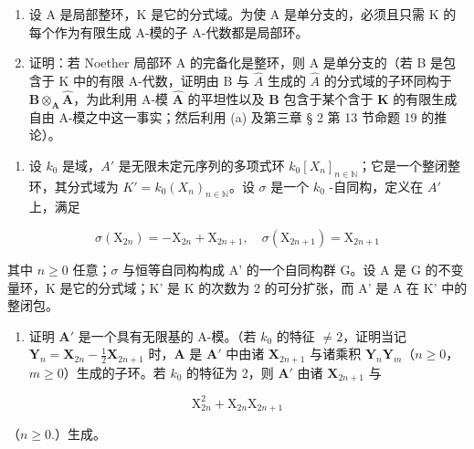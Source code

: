 \begin{enumerate}
\def\labelenumi{(\alph{enumi})}
\item
  设 A 是局部整环，K 是它的分式域。为使 A 是单分支的，必须且只需 K 的每个作为有限生成 A-模的子 A-代数都是局部环。
\item
  证明：若 Noether 局部环 A 的完备化是整环，则 A 是单分支的（若 B 是包含于 K 中的有限 A-代数，证明由 B 与 \(\hat{A}\) 生成的 \(\hat{A}\) 的分式域的子环同构于 \(\mathbf{B} \otimes_{\mathbf{A}} \hat{\mathbf{A}}\)，为此利用 A-模 \(\hat{\mathbf{A}}\) 的平坦性以及 \(\mathbf{B}\) 包含于某个含于 \(\mathbf{K}\) 的有限生成自由 A-模之中这一事实；然后利用 (a) 及第三章 § 2 第 13 节命题 19 的推论）。
\end{enumerate}

\begin{enumerate}
\def\labelenumi{\arabic{enumi}.}
\setcounter{enumi}{8}
\tightlist
\item
  设 \(k_0\) 是域，\(A'\) 是无限未定元序列的多项式环 \(k_0[X_n]_{n \in \mathbb{N}}\)；它是一个整闭整环，其分式域为 \(K' = k_0(X_n)_{n \in \mathbb{N}}\)。设 \(\sigma\) 是一个 \(k_0\) -自同构，定义在 \(A'\) 上，满足
\end{enumerate}

\[
\sigma (\mathrm{X} _ {2 n}) = - \mathrm{X} _ {2 n} + \mathrm{X} _ {2 n + 1}, \quad \sigma (\mathrm{X} _ {2 n + 1}) = \mathrm{X} _ {2 n + 1}
\]

其中 \(n \geqslant 0\) 任意；\(\sigma\) 与恒等自同构构成 A' 的一个自同构群 G。设 A 是 G 的不变量环，K 是它的分式域；K' 是 K 的次数为 2 的可分扩张，而 A' 是 A 在 K' 中的整闭包。

\begin{enumerate}
\def\labelenumi{(\alph{enumi})}
\tightlist
\item
  证明 \(\mathbf{A}'\) 是一个具有无限基的 A-模。（若 \(k_0\) 的特征 \(\neq 2\)，证明当记 \(\mathbf{Y}_n = \mathbf{X}_{2n} - \frac{1}{2}\mathbf{X}_{2n+1}\) 时，\(\mathbf{A}\) 是 \(\mathbf{A}'\) 中由诸 \(\mathbf{X}_{2n+1}\) 与诸乘积 \(\mathbf{Y}_n\mathbf{Y}_m\)（\(n \geqslant 0\)，\(m \geqslant 0\)）生成的子环。若 \(k_0\) 的特征为 2，则 \(\mathbf{A}'\) 由诸 \(\mathbf{X}_{2n+1}\) 与
\end{enumerate}

\[
\mathrm{X} _ {2 n} ^ {2} + \mathrm{X} _ {2 n} \mathrm{X} _ {2 n + 1}
\]

（\(n\geqslant 0.\)）生成。

